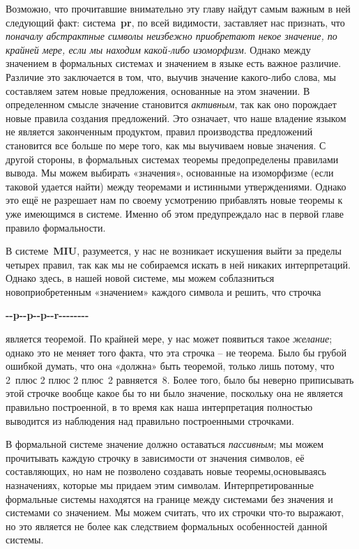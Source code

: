 \documentclass[../main.tex]{subfiles}
\begin{document}
Возможно, что прочитавшие внимательно эту главу найдут самым важным в ней следующий факт: система~\textbf{pr}, по всей видимости, заставляет нас признать, что \emph{поначалу абстрактные символы неизбежно приобретают некое значение, по крайней мере, если мы находим какой-либо изоморфизм}.
Однако между значением в формальных системах и значением в языке есть важное различие.
Различие это заключается в том, что, выучив значение какого-либо слова, мы составляем затем новые предложения, основанные на этом значении.
В определенном смысле значение становится \emph{активным}, так как оно порождает новые правила создания предложений.
Это означает, что наше владение языком не является законченным продуктом, правил производства предложений становится все больше по мере того, как мы выучиваем новые значения.
С другой стороны, в формальных системах теоремы предопределены правилами вывода.
Мы можем выбирать «значения», основанные на изоморфизме (если таковой удается найти) между теоремами и истинными утверждениями.
Однако это ещё не разрешает нам по своему усмотрению прибавлять новые теоремы к уже имеющимся в системе. Именно об этом предупреждало нас в первой главе правило формальности.

В системе~\textbf{MIU}, разумеется, у нас не возникает искушения выйти за пределы четырех правил, так как мы не собираемся искать в ней никаких интерпретаций.
Однако здесь, в нашей новой системе, мы можем соблазниться новоприобретенным «значением» каждого символа и решить, что строчка
\begin{center}
    \textbf{-{}-p-{}-p-{}-p-{}-r-{}-{}-{}-{}-{}-{}-{}-}
\end{center}
является теоремой.
По крайней мере, у нас может появиться такое \emph{желание}; однако это не меняет того факта, что эта строчка \--- не теорема.
Было бы грубой ошибкой думать, что она «должна» быть теоремой, только лишь потому, что 2~плюс 2 плюс 2 плюс~2 равняется~8.
Более того, было бы неверно приписывать этой строчке вообще какое бы то ни было значение, поскольку она не является правильно построенной, в то время как наша интерпретация полностью выводится из наблюдения над правильно построенными строчками.

В формальной системе значение должно оставаться \emph{пассивным}; мы можем прочитывать каждую строчку в зависимости от значения символов, её составляющих, но нам не позволено создавать новые теоремы,основываясь назначениях, которые мы придаем этим символам.
Интерпретированные формальные системы находятся на границе между системами без значения и системами со значением.
Мы можем считать, что их строчки что-то выражают, но это является не более как следствием формальных особенностей данной системы.
\end{document}
